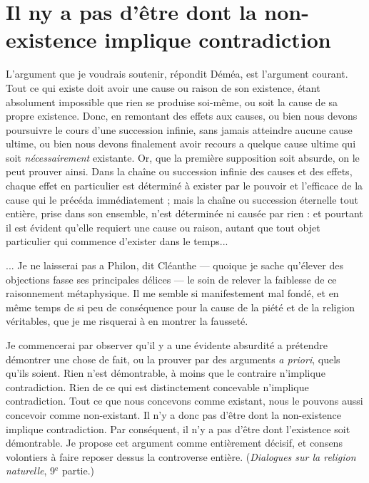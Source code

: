 
\section{ Il ny a pas d'être dont la non-existence implique contradiction}

L’argument que je voudrais soutenir, répondit Déméa,
est l’argument courant. Tout ce qui existe doit avoir
une cause ou raison de son existence, étant absolument
impossible que rien se produise soi-même, ou soit la cause
de sa propre existence. Donc, en remontant des effets aux
causes, ou bien nous devons poursuivre le cours d’une
succession infinie, sans jamais atteindre aucune cause
ultime, ou bien nous devons finalement avoir recours a
quelque cause ultime qui soit {\it nécessairement} existante. Or,
que la première supposition soit absurde, on le peut
prouver ainsi. Dans la chaîne ou succession infinie des
causes et des effets, chaque effet en particulier est déterminé
à exister par le pouvoir et l'efficace de la cause qui le
précéda immédiatement ; mais la chaîne ou succession
éternelle tout entière, prise dans son ensemble, n’est
déterminée ni causée par rien : et pourtant il est évident
qu’elle requiert une cause ou raison, autant que
tout objet particulier qui commence d’exister dans le
temps...

... Je ne laisserai pas a Philon, dit Cléanthe — quoique
je sache qu’élever des objections fasse ses principales
délices — le soin de relever la faiblesse de ce raisonnement
métaphysique. Il me semble si manifestement mal fondé,
et en même temps de si peu de conséquence pour la cause
de la piété et de la religion véritables, que je me risquerai
à en montrer la fausseté.

Je commencerai par observer qu’il y a une évidente
absurdité a prétendre démontrer une chose de fait,
ou la prouver par des arguments {\it a priori}, quels qu’ils
soient. Rien n’est démontrable, à moins que le contraire
n’implique contradiction. Rien de ce qui est distinctement
concevable n’implique contradiction. Tout ce que
nous concevons comme existant, nous le pouvons aussi
concevoir comme non-existant. Il n’y a donc pas d’être
dont la non-existence implique contradiction. Par conséquent,
il n’y a pas d’être dont l’existence soit démontrable.
Je propose cet argument comme entièrement
décisif, et consens volontiers à faire reposer dessus la
controverse entière. ({\it Dialogues sur la religion naturelle},
9$^\text{e}$ partie.)

